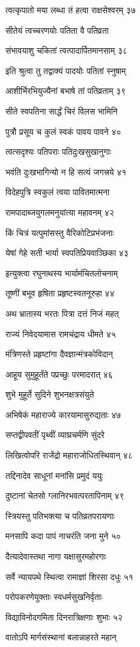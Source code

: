 त्वत्कृपातो मया लब्धा तं हत्वा राक्षसेश्वरम् ३७

सीतेयं त्वच्चरणयोः पतिता वै पतिव्रता

संभावयाशु चकितां त्वत्पादार्पितमानसाम् ३८

इति श्रुत्वा तु तद्वाक्यं पादयोः पतितां स्नुषाम्

आशीर्भिरभियुज्यैनां बभाषे तां पतिव्रताम् ३९

सीते स्वपतिना सार्द्धं चिरं विलस भामिनि

पुत्रौ प्रसूय च कुलं स्वकं पावय पावने ४०

त्वत्सदृश्यः पतिपराः पतिदुःखसुखानुगाः

भवंति दुःखभागिन्यो न हि सत्यं जगत्त्रये ४१

विदेहपुत्रि स्वकुलं त्वया पावितमात्मना

रामपादाब्जयुगलमनुयांत्या महावनम् ४२

किं चित्रं यत्पुमांसस्तु वैरिकोटिप्रभंजनाः

येषां गेहे सती भार्या स्वपतिप्रियवाञ्छिका ४३

इत्युक्त्वा रघुनाथस्य भार्यामंचितलोचनाम्

तूष्णीं बभूव हृषिता प्रहृष्टस्वतनूरुहा ४४

अथ भ्रातास्य भरतः पित्रा दत्तं निजं महत्

राज्यं निवेदयामास रामचंद्राय धीमते ४५

मंत्रिणस्ते प्रहृष्टांगा दैवज्ञान्मंत्रकोविदान्

आहूय सुमुहूर्तंते पप्रच्छुः परमादरात् ४६

शुभे मुहूर्ते सुदिने शुभनक्षत्रसंयुते

अभिषेकं महाराज्ये कारयामासुरुद्यताः ४७

सप्तद्वीपवतीं पृथ्वीं व्याघ्रचर्मणि सुंदरे

लिखित्वोपरि राजेंद्रो महाराजोधितस्थिवान् ४८

तद्दिनादेव साधूनां मनांसि प्रमुदं ययुः

दुष्टानां चेतसो ग्लानिरभवत्परतापिनाम् ४९

स्त्रियस्तु पतिभक्त्या च पतिव्रतपरायणाः

मनसापि कदा पापं नाचरंति जना मुने ५०

दैत्यादेवास्तथा नागा यक्षासुरमहोरगाः

सर्वे न्यायपथे स्थित्वा रामाज्ञां शिरसा दधुः ५१

परोपकरणेयुक्ताः स्वधर्मसुखनिर्वृताः

विद्याविनोदगमिता दिनरात्रिक्षणाः शुभाः ५२

वातोऽपि मार्गसंस्थानां बलान्नाहरते महान्

